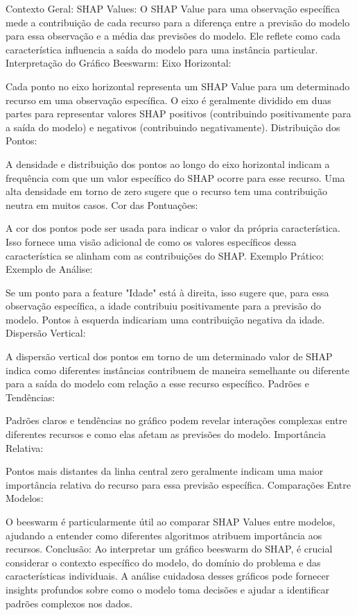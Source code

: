 Contexto Geral:
SHAP Values:
O SHAP Value para uma observação específica mede a contribuição de cada recurso para a diferença entre a previsão do modelo para essa observação e a média das previsões do modelo.
Ele reflete como cada característica influencia a saída do modelo para uma instância particular.
Interpretação do Gráfico Beeswarm:
Eixo Horizontal:

Cada ponto no eixo horizontal representa um SHAP Value para um determinado recurso em uma observação específica.
O eixo é geralmente dividido em duas partes para representar valores SHAP positivos (contribuindo positivamente para a saída do modelo) e negativos (contribuindo negativamente).
Distribuição dos Pontos:

A densidade e distribuição dos pontos ao longo do eixo horizontal indicam a frequência com que um valor específico do SHAP ocorre para esse recurso.
Uma alta densidade em torno de zero sugere que o recurso tem uma contribuição neutra em muitos casos.
Cor das Pontuações:

A cor dos pontos pode ser usada para indicar o valor da própria característica.
Isso fornece uma visão adicional de como os valores específicos dessa característica se alinham com as contribuições do SHAP.
Exemplo Prático:
Exemplo de Análise:

Se um ponto para a feature "Idade" está à direita, isso sugere que, para essa observação específica, a idade contribuiu positivamente para a previsão do modelo.
Pontos à esquerda indicariam uma contribuição negativa da idade.
Dispersão Vertical:

A dispersão vertical dos pontos em torno de um determinado valor de SHAP indica como diferentes instâncias contribuem de maneira semelhante ou diferente para a saída do modelo com relação a esse recurso específico.
Padrões e Tendências:

Padrões claros e tendências no gráfico podem revelar interações complexas entre diferentes recursos e como elas afetam as previsões do modelo.
Importância Relativa:

Pontos mais distantes da linha central zero geralmente indicam uma maior importância relativa do recurso para essa previsão específica.
Comparações Entre Modelos:

O beeswarm é particularmente útil ao comparar SHAP Values entre modelos, ajudando a entender como diferentes algoritmos atribuem importância aos recursos.
Conclusão:
Ao interpretar um gráfico beeswarm do SHAP, é crucial considerar o contexto específico do modelo, do domínio do problema e das características individuais. A análise cuidadosa desses gráficos pode fornecer insights profundos sobre como o modelo toma decisões e ajudar a identificar padrões complexos nos dados.